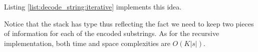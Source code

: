 Listing \ref{list:decode_string:iterative} implements this idea.


 
Notice that the stack has type
 thus reflecting the fact we need to keep two pieces of 
information for each of the encoded substrings.
As for the recursive implementation, both time and space complexities are $O(K|s|)$.